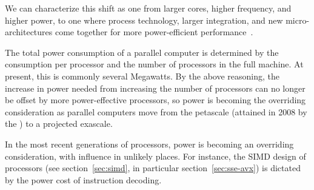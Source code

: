 We can characterize this shift as one from larger cores, higher
frequency, and higher power, to one where process technology, larger
integration, and new micro-architectures come together for more
power-efficient performance~\cite{Bohr:ISSCC2009}.

The total power consumption of a parallel computer is determined by
the consumption per processor and the number of processors in the full
machine. At present, this is commonly several Megawatts. By the above
reasoning, the increase in power needed from increasing the number of
processors can no longer be offset by more power-effective processors,
so power is becoming the overriding consideration as parallel
computers move from the petascale (attained in 2008 by the
) to a projected exascale.

In the most recent generations of processors, power is becoming an
overriding consideration, with influence in unlikely places. For
instance, the \ac{SIMD} design of processors (see
section~\ref{sec:simd}, in particular section~\ref{sec:sse-avx}) is
dictated by the power cost of instruction decoding.

